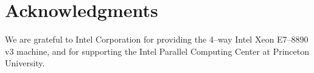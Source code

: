 \documentclass[conference]{./IEEEtran/IEEEtran}
\begin{document}
\section{Acknowledgments}
We are grateful to Intel Corporation for providing the 4–way Intel
Xeon E7–8890 v3 machine, and for supporting the Intel Parallel
Computing Center at Princeton University.





\end{document}
